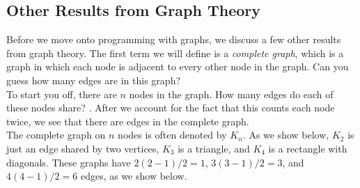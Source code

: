 \documentclass[12pt]{article}
\begin{document}
\subsection{Other Results from Graph Theory}
Before we move onto programming with graphs, we discuss a few other results from graph theory. The first term we will define is a \emph{complete graph}, which is a graph in which each node is adjacent to every other node in the graph. Can you guess how many edges are in this graph?
\\
To start you off, there are $n$ nodes in the graph. How many edges do each of these nodes share? \underline{\hspace{2cm}}. After we account for the fact that this counts each node twice, we see that there are \underline{\hspace{3cm}} edges in the complete graph.
\\
The complete graph on $n$ nodes is often denoted by $K_n$. As we show below, $K_2$ is just an edge shared by two vertices, $K_3$ is a triangle, and $K_4$ is a rectangle with diagonals. These graphs have $2(2-1)/2=1$, $3(3-1)/2=3$, and $4(4-1)/2=6$ edges, as we show below.
\\
\end{document}
